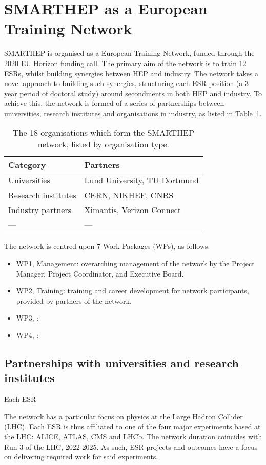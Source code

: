 \section{SMARTHEP as a European Training Network}
\label{network}
SMARTHEP is organised as a European Training Network, funded through the 2020 EU Horizon funding call. The primary aim of the network is to train 12 ESRs, whilst building synergies between HEP and industry. The network takes a novel approach to building such synergies, structuring each ESR position (a 3 year period of doctoral study) around secondments in both HEP and industry. To achieve this, the network is formed of a series of partnerships between universities, research institutes and organisations in industry, as listed in Table~\ref{partners}.

\begin{table}[h!]
    \centering
    \caption{The 18 organisations which form the SMARTHEP network, listed by organisation type.}
    \label{partners}       
    \begin{tabular}{ll}
    \hline
    Category & Partners \\\hline
    Universities        & Lund University, TU Dortmund \\
    Research institutes & CERN, NIKHEF, CNRS \\
    Industry partners   & Ximantis, Verizon Connect \\
    --- & --- \\\hline
    \end{tabular}
\end{table}

The network is centred upon 7 Work Packages (WPs), as follows:
\begin{itemize}
    \item WP1, Management: overarching management of the network by the Project Manager, Project Coordinator, and Executive Board.
    \item WP2, Training: training and career development for network participants, provided by partners of the network.
    \item WP3, :
    \item WP4, :
\end{itemize}


\subsection{Partnerships with universities and research institutes}
\label{sec-2}
Each ESR \par
The network has a particular focus on physics at the Large Hadron Collider (LHC). Each ESR is thus affiliated to one of the four major experiments based at the LHC: ALICE, ATLAS, CMS and LHCb. The network duration coincides with Run 3 of the LHC, 2022-2025. As such, ESR projects and outcomes have a focus on delivering required work for said experiments.


